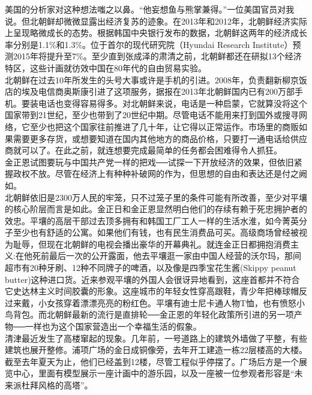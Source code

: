 美国的分析家对这种想法嗤之以鼻。“他妄想鱼与熊掌兼得。”一位美国官员对我说。但北朝鲜却微微显露出经济复苏的迹象。在2013年和2012年，北朝鲜经济实际上呈现略微成长的态势。根据韩国中央银行发布的数据，北朝鲜这两年的经济成长率分别是1.1\%和1.3\%。位于首尔的现代研究院（Hyundai Research Institute）预测2015年将提升至7\%。至少直到张成泽的肃清之前，北朝鲜都还在研拟13个经济特区，这些计画就彷效中国在80年代的自由贸易实验。\\

北朝鲜在过去10年所发生的头号大事或许是手机的引进。2008年，负责翻新柳京饭店的埃及电信商奥斯康引进了这项服务，据报在2013年北朝鲜国内已有200万部手机。要装电话也变得容易得多。对北朝鲜来说，电话是一种启蒙，它就算没将这个国家带到21世纪，至少也带到了20世纪中期。尽管电话不能用来打到国外或搜寻网络，它至少也把这个国家往前推进了几十年，让它得以正常运作。市场里的商贩如果需要更多存货，或想要知道在国内其他地方的商品价格，只要打一通电话给供应商就可以了。在此之前，就连想要完成最简单的任务都会困难得令人抓狂。\\

金正恩试图要玩与中国共产党一样的把戏──试探一下开放经济的效果，但依旧紧握政权不放。尽管在经济上有种种补破网的作为，但思想的自由和表达还是付之阙如。\\

北朝鲜依旧是2300万人民的牢笼，只不过笼子里的条件可能有所改善，至少对平壤的核心阶层而言是如此。金正日和金正恩显然明白他们的存续有赖于死忠拥护者的效忠。平壤的高层干部过去顶多拥有和韩国工厂工人一样的生活水淮，如今菁英分子至少也有舒适的公寓。如果他们有钱，也有民生消费品可买。高级商场曾经被视为耻辱，但现在北朝鲜的电视会播出豪华的开幕典礼。就连金正日都拥抱消费主义:在他死前最后一次的公开露面，他去平壤逛一家由中国人经营的沃尔玛，那间超市有20种牙刷、12种不同牌子的啤酒，以及像是四季宝花生酱(Skippy peanut butter)这种进口货。近来参观平壤的外国人会很讶异地看到，这座首都并不符合它史达林主义时间胶囊的形象。这座城市的年轻女性穿高跟鞋，青少年把棒球帽反过来戴，小女孩穿着漂漂亮亮的粉红色。平壤有迪士尼卡通人物T恤，也有愤怒小鸟背包。而北朝鲜最新的流行是直排轮──金正恩的年轻化政策所引进的另一项产物──一样也为这个国家营造出一个幸福生活的假象。\\

清津最近发生了高楼窜起的现象。几年前，一号道路上的建筑外墙做了平整，有些建筑也展开整修。浦项广场的金日成铜像旁，去年开工建造一栋22层楼高的大楼。截至去年夏天为止，他们已经盖到12楼，尽管工程似乎停摆了。广场后方是一个展览中心，里面有模型展示一座计画中的游乐园，以及一座被一位参观者形容是“未来派杜拜风格的高塔”。\\

